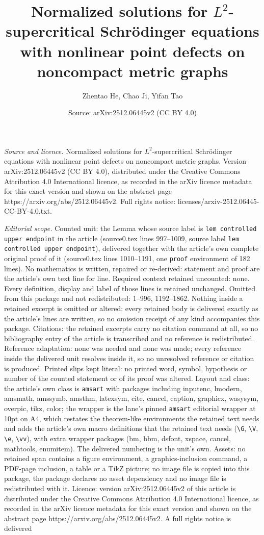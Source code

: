 \documentclass[10pt,a4paper]{amsart}
\title[Normalized solutions for $L^2$-supercritical Schr\"odinger e]{Normalized solutions for $L^2$-supercritical Schr\"odinger equations with nonlinear point defects on noncompact metric graphs}
\author{Zhentao He, Chao Ji, Yifan Tao}
\date{Source: arXiv:2512.06445v2 (CC BY 4.0)}
\begin{document}
\maketitle

\noindent\emph{Source and licence.} Normalized solutions for $L^2$-supercritical Schr\"odinger equations with nonlinear point defects on noncompact metric graphs. Version arXiv:2512.06445v2 (CC BY 4.0), distributed under the Creative Commons Attribution 4.0 International licence, as recorded in the arXiv licence metadata for this exact version and shown on the abstract page https://arxiv.org/abs/2512.06445v2. Full rights notice: licenses/arxiv-2512.06445-CC-BY-4.0.txt.\par\smallskip

\noindent\textit{Editorial scope.} Counted unit: the Lemma whose source label is \texttt{lem controlled upper endpoint} in the article (source0.tex lines 997--1009, source label \texttt{lem controlled upper endpoint}), delivered together with the article's own complete original proof of it (source0.tex lines 1010--1191, one \texttt{proof} environment of 182 lines). No mathematics is written, repaired or re-derived: statement and proof are the article's own text line for line. Required context retained uncounted: none. Every definition, display and label of those lines is retained unchanged. Omitted from this package and not redistributed: 1--996, 1192--1862. Nothing inside a retained excerpt is omitted or altered: every retained body is delivered exactly as the article's lines are written, so no omission receipt of any kind accompanies this package. Citations: the retained excerpts carry no citation command at all, so no bibliography entry of the article is transcribed and no reference is redistributed. Reference adaptation: none was needed and none was made; every reference inside the delivered unit resolves inside it, so no unresolved reference or citation is produced. Printed slips kept literal: no printed word, symbol, hypothesis or number of the counted statement or of its proof was altered. Layout and class: the article's own class is \texttt{amsart} with packages including inputenc, lmodern, amsmath, amssymb, amsthm, latexsym, cite, cancel, caption, graphicx, wasysym, overpic, tikz, color; the wrapper is the lane's pinned \texttt{amsart} editorial wrapper at 10pt on A4, which restates the theorem-like environments the retained text needs and adds the article's own macro definitions that the retained text needs (\texttt{\textbackslash G}, \texttt{\textbackslash V}, \texttt{\textbackslash e}, \texttt{\textbackslash vv}), with extra wrapper packages (bm, bbm, dsfont, xspace, cancel, mathtools, enumitem). The delivered numbering is the unit's own. Assets: no retained span contains a figure environment, a graphics-inclusion command, a PDF-page inclusion, a table or a TikZ picture; no image file is copied into this package, the package declares no asset dependency and no image file is redistributed with it. Licence: version arXiv:2512.06445v2 of this article is distributed under the Creative Commons Attribution 4.0 International licence, as recorded in the arXiv licence metadata for this exact version and shown on the abstract page https://arxiv.org/abs/2512.06445v2. A full rights notice is delivered 
\end{document}
